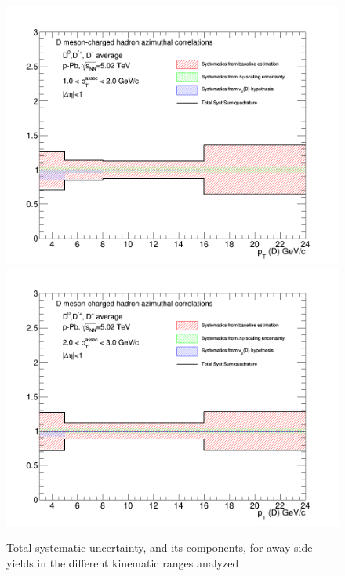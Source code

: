 \begin{figure}[!htbp]
{\includegraphics[width=0.49\linewidth, height=0.33\linewidth]{figures/FitOutput/TotalSystematicSourcesASYield_pthad1dotto2dot.png}}
{\includegraphics[width=0.49\linewidth, height=0.33\linewidth]{figures/FitOutput/TotalSystematicSourcesASYield_pthad2dotto3dot.png}}
\caption{Total systematic uncertainty, and its components, for away-side yields in the different kinematic ranges analyzed}
\label{fig:ASyieldTotalUnc}
\end{figure}

